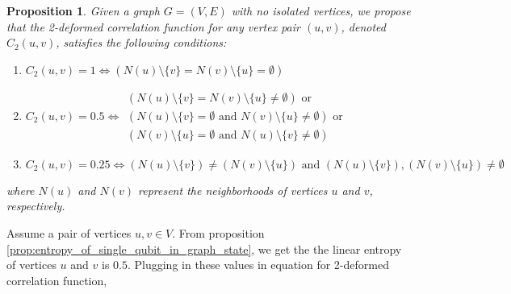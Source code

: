 \documentclass{article}
\newtheorem{prop}{Proposition}
\begin{document}




\begin{prop} \label{prop:correlation_function_relation_with_graph_structure}
Given a graph $ G = (V, E) $ with no isolated vertices, we propose that the 2-deformed correlation function for any vertex pair $ (u, v) $, denoted $ C_2(u, v) $, satisfies the following conditions:
\begin{enumerate}
    \item $C_2(u, v) = 1 \iff (N(u) \setminus \{v\} = N(v) \setminus \{u\} = \emptyset)$
    \item
    $C_2(u, v) = 0.5 \iff 
\begin{aligned}(N(u) \setminus \{v\} = N(v) \setminus \{u\} \neq \emptyset) \text{ or } \\
(N(u) \setminus \{v\} = \emptyset \text{ and } N(v) \setminus \{u\} \neq \emptyset) 
\text{ or } \\
(N(v) \setminus \{u\} = \emptyset \text{ and } N(u) \setminus \{v\} \neq \emptyset)
\end{aligned}$


    \item $ C_2(u, v) = 0.25 \iff (N(u) \setminus \{v\}) \neq (N(v) \setminus \{u\}) \text{ and } (N(u) \setminus \{v\}), (N(v) \setminus \{u\}) \neq \emptyset $

\end{enumerate}

where $ N(u) $ and $ N(v) $ represent the neighborhoods of vertices $ u $ and $ v $, respectively.
\end{prop}
Assume a pair of vertices $u, v \in V$. From proposition \ref{prop:entropy_of_single_qubit_in_graph_state}, we get the the linear entropy of vertices $u$ and $v$ is $0.5$. Plugging in these values in equation for 2-deformed correlation function, 
\end{document}
